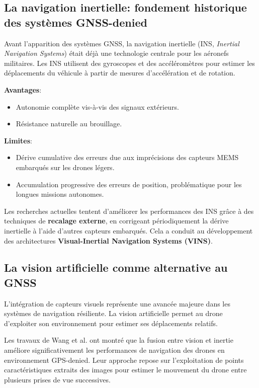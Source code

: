 \documentclass[12pt, a4paper, twoside, openright]{report}
\begin{document}
\subsection{La navigation inertielle: fondement historique des systèmes GNSS-denied}
Avant l’apparition des systèmes GNSS, la navigation inertielle (INS, \textit{Inertial Navigation Systems}) était déjà une technologie centrale pour les aéronefs militaires. Les INS utilisent des gyroscopes et des accéléromètres pour estimer les déplacements du véhicule à partir de mesures d’accélération et de rotation.

\textbf{Avantages}:
\begin{itemize}
    \item Autonomie complète vis-à-vis des signaux extérieurs.
    \item Résistance naturelle au brouillage.
\end{itemize}

\textbf{Limites}:
\begin{itemize}
    \item Dérive cumulative des erreurs due aux imprécisions des capteurs MEMS embarqués sur les drones légers.
    \item Accumulation progressive des erreurs de position, problématique pour les longues missions autonomes.
\end{itemize}

Les recherches actuelles tentent d’améliorer les performances des INS grâce à des techniques de \textbf{recalage externe}, en corrigeant périodiquement la dérive inertielle à l’aide d’autres capteurs embarqués. Cela a conduit au développement des architectures \textbf{Visual-Inertial Navigation Systems (VINS)}.

\subsection{La vision artificielle comme alternative au GNSS}
L’intégration de capteurs visuels représente une avancée majeure dans les systèmes de navigation résiliente. La vision artificielle permet au drone d’exploiter son environnement pour estimer ses déplacements relatifs.

Les travaux de Wang et al.\cite{wang2013visual} ont montré que la fusion entre vision et inertie améliore significativement les performances de navigation des drones en environnement GPS-denied. Leur approche repose sur l’exploitation de points caractéristiques extraits des images pour estimer le mouvement du drone entre plusieurs prises de vue successives.
\end{document}
